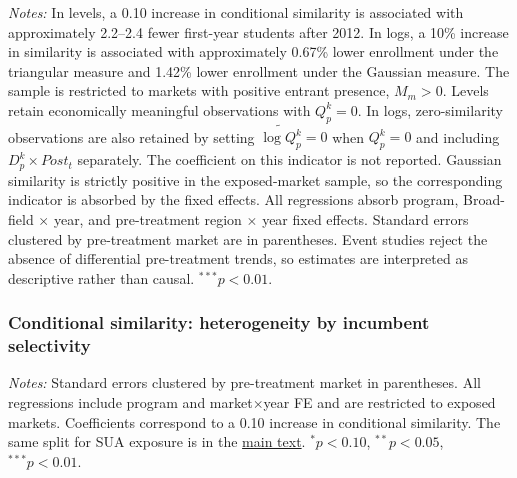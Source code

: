 \documentclass{beamer}
\begin{document}
\begin{frame}[label=sua-similarity-first-stage]
\begin{table}
\parbox{0.94\textwidth}{
\tiny
\textit{Notes:}
In levels, a 0.10 increase in conditional similarity is associated with
approximately 2.2--2.4 fewer first-year students after 2012.
In logs, a 10\% increase in similarity is associated with approximately
0.67\% lower enrollment under the triangular measure and 1.42\% lower
enrollment under the Gaussian measure.
The sample is restricted to markets with positive entrant presence,
$M_m>0$. Levels retain economically meaningful observations with $Q_p^k=0$.
In logs, zero-similarity observations are also retained by setting
$\widetilde{\log Q_p^k}=0$ when $Q_p^k=0$ and including
$D_p^k\times Post_t$ separately. The coefficient on this indicator is not
reported. Gaussian similarity is strictly positive in the exposed-market
sample, so the corresponding indicator is absorbed by the fixed effects.
All regressions absorb program, Broad-field $\times$ year, and
pre-treatment region $\times$ year fixed effects.
Standard errors clustered by pre-treatment market are in parentheses.
Event studies reject the absence of differential pre-treatment trends,
so estimates are interpreted as descriptive rather than causal.
$^{***}p<0.01$.
}

\end{table}

\end{frame}

\begin{frame}[label=sua-q-heterogeneity]

\frametitle{Conditional similarity: heterogeneity by incumbent selectivity}

\centering

\begin{table}
\centering
\tiny
\setlength{\tabcolsep}{4.5pt}
\renewcommand{\arraystretch}{0.95}


\end{table}

\vspace{-0.05cm}

\parbox{0.95\textwidth}{
\tiny
\textit{Notes:}
Standard errors clustered by pre-treatment market in parentheses.
All regressions include program and market$\times$year FE and are restricted
to exposed markets. Coefficients correspond to a 0.10 increase in conditional
similarity. The same split for SUA exposure is in the
\hyperlink{sua-selectivity-heterogeneity}{\color{blue}main text}.
$^{*}p<0.10$, $^{**}p<0.05$, $^{***}p<0.01$.
}

\end{frame}
\end{document}
